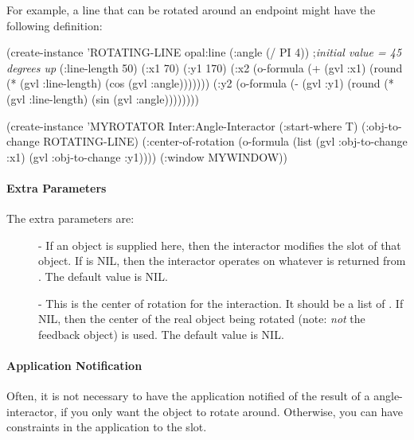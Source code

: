 For example, a line that can be rotated around an endpoint might have
the following definition:
\begin{programexample}
(create-instance 'ROTATING-LINE opal:line
   (:angle (/ PI 4))  ;{\it initial value = 45 degrees up}
   (:line-length 50)
   (:x1 70)
   (:y1 170)
   (:x2 (o-formula (+ (gvl :x1)
                      (round (* (gvl :line-length)
				(cos (gvl :angle)))))))
   (:y2 (o-formula (- (gvl :y1)
		      (round (* (gvl :line-length)
				(sin (gvl :angle))))))))

(create-instance 'MYROTATOR Inter:Angle-Interactor
   (:start-where T)
   (:obj-to-change ROTATING-LINE)
   (:center-of-rotation (o-formula (list (gvl :obj-to-change :x1)
					 (gvl :obj-to-change :y1))))
   (:window MYWINDOW))
\end{programexample}



\paragraph{Extra Parameters}

The extra parameters are:
\begin{description}
\item[] 
- If an object is supplied here, then the interactor modifies the
 slot of that object.  If  is NIL, then the
interactor operates on whatever is returned from .
The default value is NIL.

\item[] 
- This is the center of rotation for the interaction.  It should be a list
of .  If NIL, then the center of the real object being rotated
(note: {\it not} the feedback object) is used.  The default value is NIL.
\end{description}

\paragraph{Application Notification}

Often, it is not necessary to have the application notified of the result
of a angle-interactor, if you only want the object to rotate around.
Otherwise, you can have constraints in the application to the  slot.

